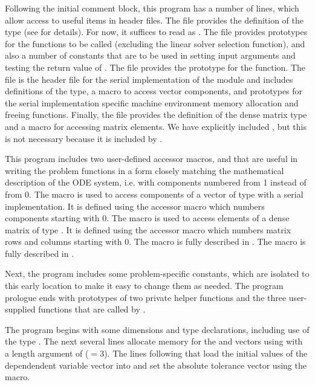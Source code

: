 Following the initial comment block, this program has a number
of  lines, which allow access to useful items in {\cvode}
header files.  The  file provides the definition of the
type  (see  for details).  
For now, it suffices to read  as .
The  file provides prototypes for the {\cvode}
functions to be called (excluding the linear solver selection
function), and also a number of constants that are to be used in
setting input arguments and testing the return value of .
The  file provides the prototype for the  function.
The  file is the header file for the serial
implementation of the {\nvector} module and includes definitions of the 
 type, a macro to access vector components, and prototypes 
for the serial implementation specific machine environment memory allocation
and freeing functions.
Finally, the  file provides the definition of the dense
matrix type  and a macro for accessing matrix elements.
We have explicitly included , but this is not necessary because 
it is included by .

This program includes two user-defined accessor macros,  and
 that are useful in writing the problem functions in a form
closely matching the mathematical description of the ODE system,
i.e. with components numbered from 1 instead of from 0.  The 
macro is used to access components of a vector of type 
with a serial implementation.  It is defined using the {\nvecs}
accessor macro  which numbers components starting with
0. The  macro is used to access elements of a dense matrix of
type . It is defined using the {\dense} accessor macro
 which numbers matrix rows and columns starting with
0. 
The macro  is fully described in .
The macro  is fully described in .

Next, the program includes some problem-specific constants, which are
isolated to this early location to make it easy to change them as needed.  
The program prologue ends with prototypes of two private helper
functions and the three user-supplied functions that are called by {\cvode}.

The  program begins with some dimensions and type declarations,
including use of the type .  The next several lines
allocate memory for the  and  vectors using
 with a length argument of  ($= 3$). The
lines following that load the initial values of the dependendent
variable vector into  and set the absolute tolerance vector
 using the  macro.

